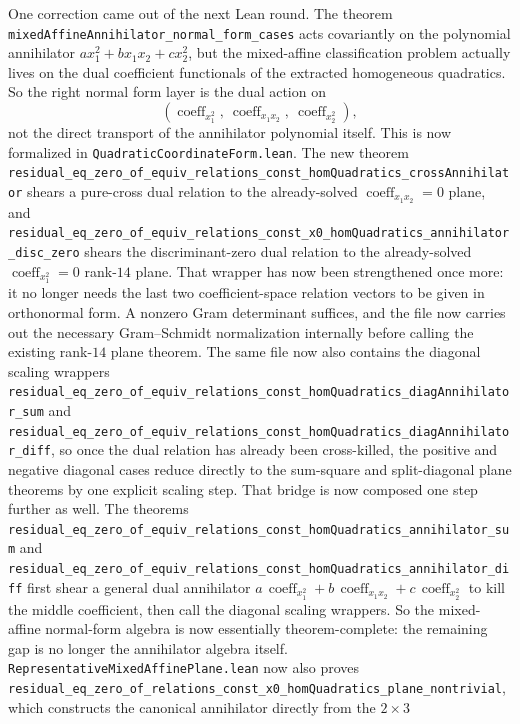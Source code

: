 \documentclass[11pt]{article}
\begin{document}
One correction came out of the next Lean round. The theorem
\texttt{mixedAffineAnnihilator\_normal\_form\_cases} acts covariantly on the
polynomial annihilator \(a x_1^2 + b x_1x_2 + c x_2^2\), but the mixed-affine
classification problem actually lives on the dual coefficient functionals of
the extracted homogeneous quadratics. So the right normal form layer is the
dual action on
\[
  (\operatorname{coeff}_{x_1^2},\ \operatorname{coeff}_{x_1x_2},\
  \operatorname{coeff}_{x_2^2}),
\]
not the direct transport of the annihilator polynomial itself. This is now
formalized in \texttt{QuadraticCoordinateForm.lean}. The new theorem
\texttt{residual\_eq\_zero\_of\_equiv\_relations\_const\_homQuadratics\_crossAnnihilator}
shears a pure-cross dual relation to the already-solved
\(\operatorname{coeff}_{x_1x_2}=0\) plane, and
\texttt{residual\_eq\_zero\_of\_equiv\_relations\_const\_x0\_homQuadratics\_annihilator\_disc\_zero}
shears the discriminant-zero dual relation to the already-solved
\(\operatorname{coeff}_{x_1^2}=0\) rank-$14$ plane.
That wrapper has now been strengthened once more: it no longer needs the last
two coefficient-space relation vectors to be given in orthonormal form. A
nonzero Gram determinant suffices, and the file now carries out the necessary
Gram--Schmidt normalization internally before calling the existing rank-$14$
plane theorem.
The same file now also contains the diagonal scaling wrappers
\texttt{residual\_eq\_zero\_of\_equiv\_relations\_const\_homQuadratics\_diagAnnihilator\_sum}
and
\texttt{residual\_eq\_zero\_of\_equiv\_relations\_const\_homQuadratics\_diagAnnihilator\_diff},
so once the dual relation has already been cross-killed, the positive and
negative diagonal cases reduce directly to the sum-square and split-diagonal
plane theorems by one explicit scaling step.
That bridge is now composed one step further as well. The theorems
\texttt{residual\_eq\_zero\_of\_equiv\_relations\_const\_homQuadratics\_annihilator\_sum}
and
\texttt{residual\_eq\_zero\_of\_equiv\_relations\_const\_homQuadratics\_annihilator\_diff}
first shear a general dual annihilator
\(
  a\,\operatorname{coeff}_{x_1^2} +
  b\,\operatorname{coeff}_{x_1x_2} +
  c\,\operatorname{coeff}_{x_2^2}
\)
to kill the middle coefficient, then call the diagonal scaling wrappers. So the
mixed-affine normal-form algebra is now essentially theorem-complete: the
remaining gap is no longer the annihilator algebra itself.
\texttt{RepresentativeMixedAffinePlane.lean} now also proves
\texttt{residual\_eq\_zero\_of\_relations\_const\_x0\_homQuadratics\_plane\_nontrivial},
which constructs the canonical annihilator directly from the \(2\times 3\)
\end{document}
